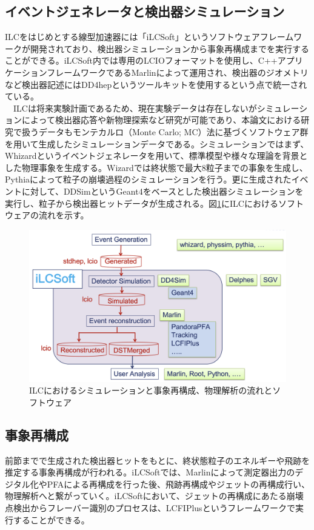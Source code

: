 \subsection{イベントジェネレータと検出器シミュレーション}
ILCをはじめとする線型加速器には「iLCSoft」というソフトウェアフレームワークが開発されており、検出器シミュレーションから事象再構成までを実行することができる。iLCSoft内では専用のLCIOフォーマットを使用し、C++アプリケーションフレームワークであるMarlinによって運用され、検出器のジオメトリなど検出器記述にはDD4hepというツールキットを使用するという点で統一されている。\\
　ILCは将来実験計画であるため、現在実験データは存在しないがシミュレーションによって検出器応答や新物理探索など研究が可能であり、本論文における研究で扱うデータもモンテカルロ（Monte Carlo; MC）法に基づくソフトウェア群を用いて生成したシミュレーションデータである。シミュレーションではまず、Whizardというイベントジェネレータを用いて、標準模型や様々な理論を背景とした物理事象を生成する。Wizardでは終状態で最大8粒子までの事象を生成し、Pythiaによって粒子の崩壊過程のシミュレーションを行う。更に生成されたイベントに対して、DDSimというGeant4をベースとした検出器シミュレーションを実行し、粒子から検出器ヒットデータが生成される。図\ref{ilcsoft}にILCにおけるソフトウェアの流れを示す。
\begin{figure}[h]
	\begin{center}
 \includegraphics[keepaspectratio, scale=0.25]
 	{Figure/Introduction/ilcsoft.png}
 		\caption {ILCにおけるシミュレーションと事象再構成、物理解析の流れとソフトウェア}
 		\label{ilcsoft}
	\end{center}
\end{figure}
\subsection{事象再構成}
前節までで生成された検出器ヒットをもとに、終状態粒子のエネルギーや飛跡を推定する事象再構成が行われる。iLCSoftでは、Marlinによって測定器出力のデジタル化やPFAによる再構成を行った後、飛跡再構成やジェットの再構成行い、物理解析へと繋がっていく。iLCSoftにおいて、ジェットの再構成にあたる崩壊点検出からフレーバー識別のプロセスは、LCFIPlus\cite{lcfiplus}というフレームワークで実行することができる。
